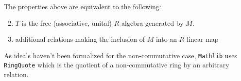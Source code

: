 \begin{remark}
    \label{mk:TensorAlgebra}

    The properties above are equivalent to the following:

    \begin{enumerate}
        \setcounter{enumi}{1}
        \item $T$ is the free (associative, unital) $R$-algebra generated by $M$.
        \item additional relations making the inclusion of $M$ into an $R$-linear map
    \end{enumerate}

    As ideals haven't been formalized for the non-commutative case, \texttt{Mathlib} uses \texttt{RingQuote} which is
    the quotient of a non-commutative ring by an arbitrary relation.
    
\end{remark}